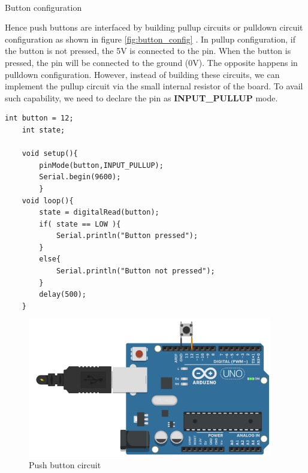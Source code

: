     \begin{marginfigure}
        \centering
        \\
        \captionsetup{type=figure}
        \caption{Button configuration}
        \label{fig:button_config}
    \end{marginfigure}
    
    Hence push buttons are interfaced by building pullup circuits or pulldown circuit configuration as shown in figure \ref{fig:button_config} . In pullup configuration, if the button is not pressed, the 5V is connected to the pin. When the button is pressed, the pin will be connected to the ground (0V). The opposite happens in pulldown configuration. However, instead of building these circuits, we can implement the pullup circuit via the small internal resistor of the board. To avail such capability, we need to declare the pin as \textbf{INPUT\_PULLUP} mode.

    \begin{lstlisting}[style=CStyle]
    int button = 12;
    int state;

    void setup(){
        pinMode(button,INPUT_PULLUP);
        Serial.begin(9600);
        }
    void loop(){
        state = digitalRead(button);
        if( state == LOW ){
            Serial.println("Button pressed");
        }
        else{
            Serial.println("Button not pressed");
        }
        delay(500);
    }
    \end{lstlisting}
    
    \begin{figure}
        \centering
        \includegraphics[width=4.2in]{Images/Programing_Arduino/button_ckt.png}
        \caption{Push button circuit}
    \end{figure}
    
